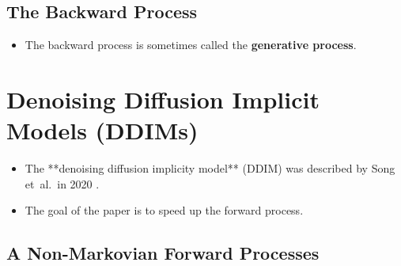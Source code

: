 \documentclass[10pt]{article}
\newcommand{\etal}{{et~al.}}
\begin{document}
\subsection{The Backward Process}

\begin{itemize}
  \item The backward process is sometimes called the {\bf generative process}.
\end{itemize}

\section{Denoising Diffusion Implicit Models (DDIMs)}

\begin{itemize}
  \item The **denoising diffusion implicity model** (DDIM) was described by Song \etal\ in 2020 \cite{Song:2020}.
  
  \item The goal of the paper is to speed up the forward process.
\end{itemize}

\subsection{A Non-Markovian Forward Processes}
\end{document}
